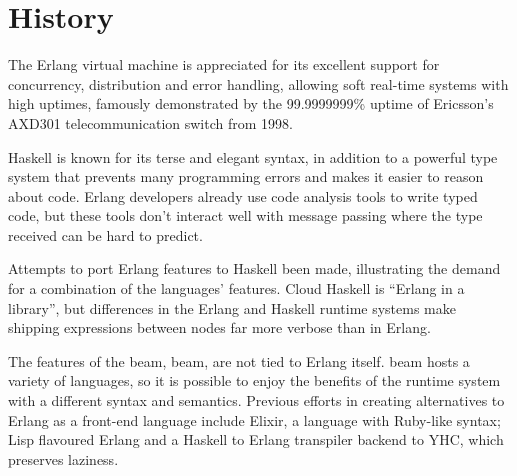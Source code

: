 \section{History}

The Erlang virtual machine is appreciated for its excellent support for concurrency, distribution and error handling, allowing soft real-time systems with high uptimes, famously demonstrated by the 99.9999999\% uptime of Ericsson’s AXD301 telecommunication switch from 1998\cite{ninenines}.

Haskell is known for its terse and elegant syntax, in addition to a powerful type system that prevents many programming errors and makes it easier to reason about code. Erlang developers already use code analysis tools to write typed code, but these tools don’t interact well with message passing where the type received can be hard to predict. 

Attempts to port Erlang features to Haskell been made, illustrating the demand for a combination of the languages' features. Cloud Haskell\cite{cloudhaskell} is ``Erlang in a library'', but differences in the Erlang and Haskell runtime systems make shipping expressions between nodes far more verbose than in Erlang.

The features of the \gls{beam}, \glsdesc{beam}, are not tied to Erlang itself. \Gls{beam} hosts a variety of languages, so it is possible to enjoy the benefits of the runtime system with a different syntax and semantics. Previous efforts in creating alternatives to Erlang as a front-end language include Elixir\cite{elixir}, a language with Ruby-like syntax; Lisp flavoured Erlang\cite{lfe} and a Haskell to Erlang transpiler backend to YHC\cite{yhc}, which preserves laziness.
